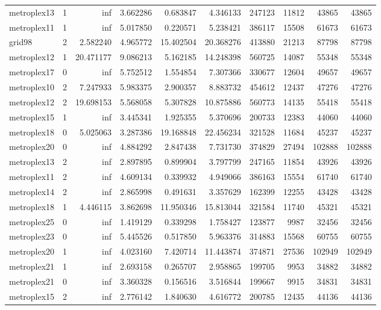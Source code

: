 \begin{longtable}{|l|r|r|r|r|r|r|r|r|r|}
metroplex13 & 1 & inf & 3.662286 & 0.683847 & 4.346133 & 247123 & 11812 & 43865 & 43865 \\
metroplex11 & 1 & inf & 5.017850 & 0.220571 & 5.238421 & 386117 & 15508 & 61673 & 61673 \\
grid98 & 2 & 2.582240 & 4.965772 & 15.402504 & 20.368276 & 413880 & 21213 & 87798 & 87798 \\
metroplex12 & 1 & 20.471177 & 9.086213 & 5.162185 & 14.248398 & 560725 & 14087 & 55348 & 55348 \\
metroplex17 & 0 & inf & 5.752512 & 1.554854 & 7.307366 & 330677 & 12604 & 49657 & 49657 \\
metroplex10 & 2 & 7.247933 & 5.983375 & 2.900357 & 8.883732 & 454612 & 12437 & 47276 & 47276 \\
metroplex12 & 2 & 19.698153 & 5.568058 & 5.307828 & 10.875886 & 560773 & 14135 & 55418 & 55418 \\
metroplex15 & 1 & inf & 3.445341 & 1.925355 & 5.370696 & 200733 & 12383 & 44060 & 44060 \\
metroplex18 & 0 & 5.025063 & 3.287386 & 19.168848 & 22.456234 & 321528 & 11684 & 45237 & 45237 \\
metroplex20 & 0 & inf & 4.884292 & 2.847438 & 7.731730 & 374829 & 27494 & 102888 & 102888 \\
metroplex13 & 2 & inf & 2.897895 & 0.899904 & 3.797799 & 247165 & 11854 & 43926 & 43926 \\
metroplex11 & 2 & inf & 4.609134 & 0.339932 & 4.949066 & 386163 & 15554 & 61740 & 61740 \\
metroplex14 & 2 & inf & 2.865998 & 0.491631 & 3.357629 & 162399 & 12255 & 43428 & 43428 \\
metroplex18 & 1 & 4.446115 & 3.862698 & 11.950346 & 15.813044 & 321584 & 11740 & 45321 & 45321 \\
metroplex25 & 0 & inf & 1.419129 & 0.339298 & 1.758427 & 123877 & 9987 & 32456 & 32456 \\
metroplex23 & 0 & inf & 5.445526 & 0.517850 & 5.963376 & 314883 & 15568 & 60755 & 60755 \\
metroplex20 & 1 & inf & 4.023160 & 7.420714 & 11.443874 & 374871 & 27536 & 102949 & 102949 \\
metroplex21 & 1 & inf & 2.693158 & 0.265707 & 2.958865 & 199705 & 9953 & 34882 & 34882 \\
metroplex21 & 0 & inf & 3.360328 & 0.156516 & 3.516844 & 199667 & 9915 & 34831 & 34831 \\
metroplex15 & 2 & inf & 2.776142 & 1.840630 & 4.616772 & 200785 & 12435 & 44136 & 44136 \\

\end{longtable}
